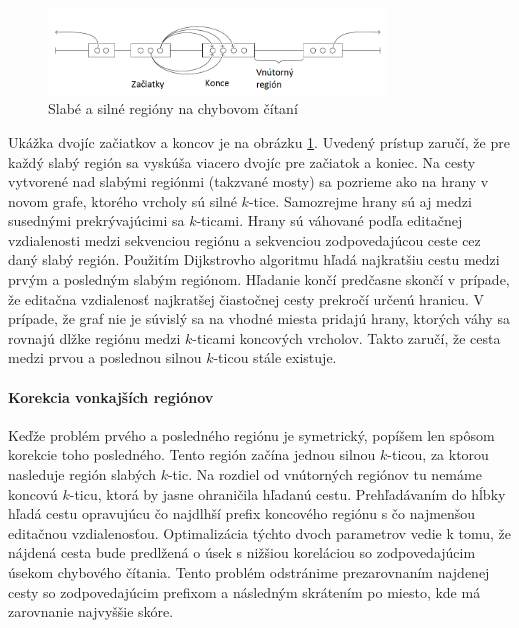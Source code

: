 \begin{figure}
    \centering
    \includegraphics[width=0.8\textwidth]{images/lordec.png}
    \caption{Slabé a silné regióny na chybovom čítaní}
    \label{fig:weakstrongregions}
\end{figure}
Ukážka dvojíc začiatkov a koncov je na obrázku \ref{fig:weakstrongregions}. Uvedený prístup zaručí, že pre každý slabý región sa vyskúša viacero dvojíc pre začiatok a koniec. Na cesty vytvorené nad slabými regiónmi (takzvané mosty) sa pozrieme ako na hrany v novom grafe, ktorého vrcholy sú silné $k$-tice. Samozrejme hrany sú aj medzi susednými prekrývajúcimi sa $k$-ticami. Hrany sú váhované podľa editačnej vzdialenosti medzi sekvenciou regiónu a sekvenciou zodpovedajúcou ceste cez daný slabý región. Použitím Dijkstrovho algoritmu hľadá najkratšiu cestu medzi prvým a posledným slabým regiónom. Hľadanie končí predčasne skončí v prípade, že editačna vzdialenosť najkratšej čiastočnej cesty prekročí určenú hranicu. V prípade, že graf nie je súvislý sa na vhodné miesta pridajú hrany, ktorých váhy sa rovnajú dlžke regiónu medzi $k$-ticami koncových vrcholov. Takto zaručí, že cesta medzi prvou a poslednou silnou $k$-ticou stále existuje.

\paragraph{Korekcia vonkajších regiónov}

Keďže problém prvého a posledného regiónu je symetrický, popíšem len spôsom korekcie toho posledného. Tento región začína jednou silnou $k$-ticou, za ktorou nasleduje región slabých $k$-tic. Na rozdiel od vnútorných regiónov tu nemáme koncovú $k$-ticu, ktorá by jasne ohraničila hľadanú cestu. Prehľadávaním do hĺbky hľadá cestu opravujúcu čo najdlhší prefix koncového regiónu s čo najmenšou editačnou vzdialenosťou. Optimalizácia týchto dvoch parametrov vedie k tomu, že nájdená cesta bude predlžená o úsek s nižšiou koreláciou so zodpovedajúcim úsekom chybového čítania. Tento problém odstránime prezarovnaním najdenej cesty so zodpovedajúcim prefixom a následným skrátením po miesto, kde má zarovnanie najvyššie skóre.











